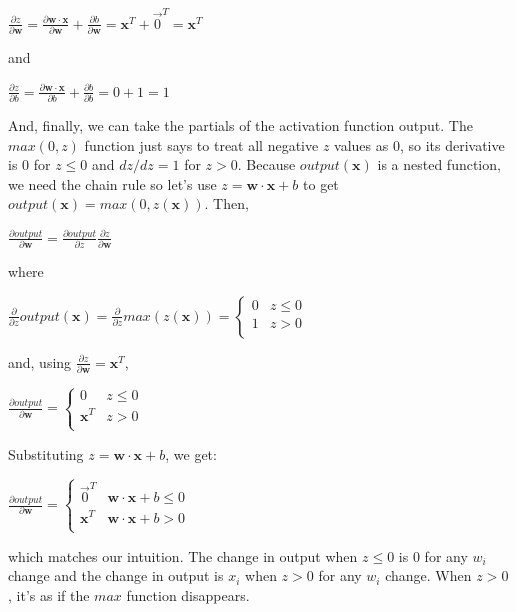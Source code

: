 \documentclass[11pt]{article}
\begin{document}
$\frac{\partial z}{\partial \mathbf{w}} = \frac{\partial \mathbf{w} \cdot \mathbf{x}}{\partial \mathbf{w}} + \frac{\partial b}{\partial \mathbf{w}} = \mathbf{x}^T + \vec{0}^T = \mathbf{x}^T$

and

$\frac{\partial z}{\partial b} = \frac{\partial \mathbf{w} \cdot \mathbf{x}}{\partial b} + \frac{\partial b}{\partial b} = 0 + 1 = 1$

And, finally, we can take the partials of the activation function output. The $max(0,z)$ function just says to treat all negative $z$ values as 0, so its derivative is 0 for $z \leq 0$ and $dz/dz = 1$ for $z > 0$. Because $output(\mathbf{x})$ is a nested function, we need the chain rule so let's use $z = \mathbf{w} \cdot \mathbf{x} + b$ to get $output(\mathbf{x}) = max(0,z(\mathbf{x}))$. Then,

$\frac{\partial output}{\partial \mathbf{w}} = \frac{\partial output}{\partial z}\frac{\partial z}{\partial \mathbf{w}}$

where

$\frac{\partial}{\partial z} output(\mathbf{x}) = \frac{\partial}{\partial z} max(z(\mathbf{x})) = \begin{cases}
	0 & z \leq 0\\
	1 & z > 0\\
\end{cases}
$

and, using $\frac{\partial z}{\partial \mathbf{w}} = \mathbf{x}^T$,

$\frac{\partial output}{\partial \mathbf{w}} = \begin{cases}
	0 & z \leq 0\\
	\mathbf{x}^T & z > 0\\
\end{cases}
$

Substituting $z = \mathbf{w} \cdot \mathbf{x} + b$, we get:

$\frac{\partial output}{\partial \mathbf{w}} = \begin{cases}
	\vec{0}^T & \mathbf{w} \cdot \mathbf{x} + b \leq 0\\
	\mathbf{x}^T & \mathbf{w} \cdot \mathbf{x} + b > 0\\
\end{cases}
$

which matches our intuition. The change in output when $z \leq 0$ is 0 for any $w_i$ change and the change in output is $x_i$ when $z > 0$ for any $w_i$ change. When $z > 0$, it's as if the $max$ function disappears. 
\end{document}
